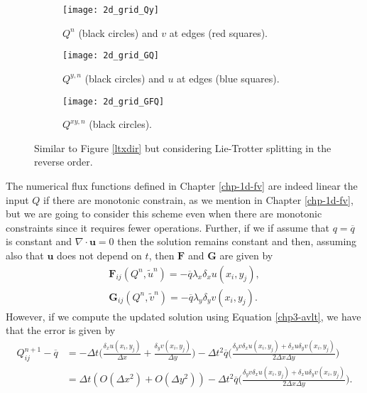 \begin{figure}[!htb]
	\centering
	\begin{subfigure}{0.3\textwidth}
		\centering
		\texttt{[image: 2d\_grid\_Qy]}
		\caption{$Q^n$ (black circles) and $v$ at edges (red squares). \label{lt-Qy}}
	\end{subfigure}
	\begin{subfigure}{0.3\textwidth}
		\centering
		\texttt{[image: 2d\_grid\_GQ]}
		\caption{$Q^{y,n}$ (black circles) and $u$ at edges (blue squares).\label{lt-GQy} }
	\end{subfigure}
	\begin{subfigure}{0.3\textwidth}
		\centering
		\texttt{[image: 2d\_grid\_GFQ]}
		\caption{$Q^{xy,n}$ (black circles). \label{lt-FGQy}}
	\end{subfigure}
	\caption{Similar to Figure \ref{ltxdir} but considering Lie-Trotter splitting in the reverse order.}
\end{figure}
The numerical flux functions defined in Chapter \ref{chp-1d-fv} are indeed linear the input $Q$ if there are monotonic constrain, 
as we mention in Chapter \ref{chp-1d-fv}, but we are going to consider this scheme even when there are monotonic constraints since it requires fewer operations.
Further, if we if assume that $q = \overline{q}$ is constant and $\nabla \cdot \boldsymbol{u} = 0$ then the solution
remains constant and then, assuming also that $\boldsymbol{u}$ does not depend on $t$, then $\mathbf{F}$ and $\mathbf{G}$ are given by
\begin{align*}
	\mathbf{F}_{ij}(Q^n,\tilde{u}^n) = -\overline{q} \lambda_x{\delta_x} u(x_i,y_j),\\
	\mathbf{G}_{ij}(Q^n,\tilde{v}^n) = -\overline{q} \lambda_y{\delta_y} v(x_i,y_j).
\end{align*}
However, if we compute the updated solution using Equation \eqref{chp3-avlt}, we have that the error is given by
\begin{align}
	\label{chp3-avlt-error}
	Q^{n+1}_{ij} - \overline{q} &= 
	-\Delta t \bigg(\frac{\delta_x u(x_i,y_j)}{\Delta x} + 	\frac{\delta_y v(x_i,y_j)}{\Delta y} \bigg)
	-\Delta t^2 \overline{q}\bigg( \frac{\delta_y v \delta_x u(x_i,y_j) + \delta_x u\delta_y v(x_i,y_j)}{2\Delta x \Delta y} \bigg) \\
	&= \Delta t (O(\Delta x^2) + O(\Delta y^2))
	   -\Delta t^2 \overline{q}\bigg( \frac{\delta_y v \delta_x u(x_i,y_j) + \delta_x u\delta_y v(x_i,y_j)}{2\Delta x \Delta y} \bigg).
\end{align}
